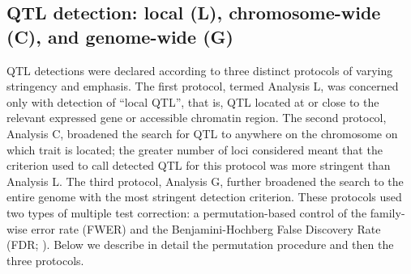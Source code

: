 \documentclass[9pt,twocolumn,twoside]{gsajnl}
\newcommand{\eg}{\emph{e.g.}\xspace}
\begin{document}

\subsection{QTL detection: local (L), chromosome-wide (C), and genome-wide (G)}

QTL detections were declared according to three distinct protocols of varying stringency and emphasis. The first protocol, termed Analysis L, was concerned only with detection of ``local QTL'', that is, QTL located at or close to the relevant expressed gene or accessible chromatin region.
The second protocol, Analysis C, broadened the search for QTL to anywhere on the chromosome on which trait is located; the greater number of loci considered meant that the criterion used to call detected QTL for this protocol was more stringent than Analysis L.
The third protocol, Analysis G, further broadened the search to the entire genome with the most stringent detection criterion.
These protocols used two types of multiple test correction: a permutation-based control of the family-wise error rate (FWER) and the Benjamini-Hochberg False Discovery Rate (FDR; \citealt{Benjamini1995}). Below we describe in detail the permutation procedure and then the three protocols.

\end{document}
